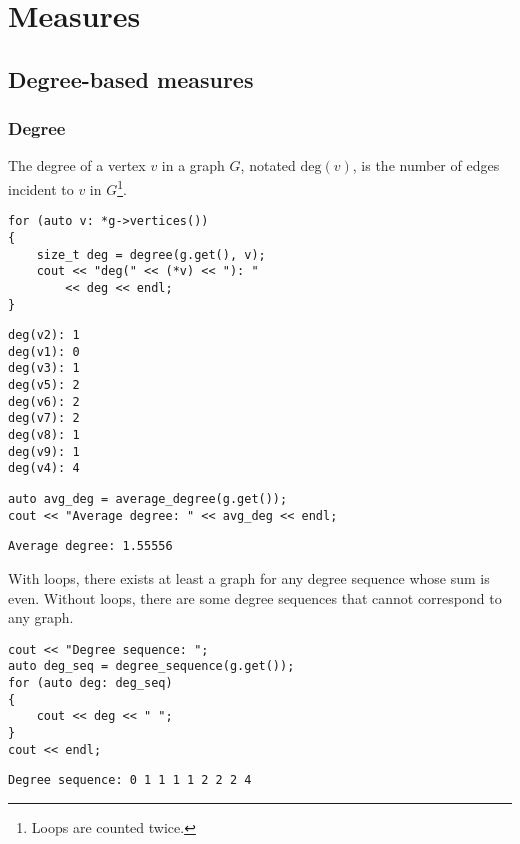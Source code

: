 \chapter{Measures}

\section{Degree-based measures}

\subsection{Degree}

\begin{definition}[Degree]
The degree of a vertex $v$ in a graph $G$, notated $\mathrm{deg}(v)$, is the number of edges incident to $v$ in $G$\footnote{Loops are counted twice.}. 
\end{definition}

\begin{lstlisting}[style=c++] 
for (auto v: *g->vertices())
{
    size_t deg = degree(g.get(), v);
    cout << "deg(" << (*v) << "): "
        << deg << endl;
}
\end{lstlisting}
\begin{lstlisting}[style=out]
deg(v2): 1
deg(v1): 0
deg(v3): 1
deg(v5): 2
deg(v6): 2
deg(v7): 2
deg(v8): 1
deg(v9): 1
deg(v4): 4
\end{lstlisting}


\begin{lstlisting}[style=c++] 
auto avg_deg = average_degree(g.get());
cout << "Average degree: " << avg_deg << endl;
\end{lstlisting}
\begin{lstlisting}[style=out]
Average degree: 1.55556
\end{lstlisting}

With loops, there exists at least a graph for any degree sequence whose sum is even. Without loops, there are some degree sequences that cannot correspond to any graph.

\begin{lstlisting}[style=c++] 
cout << "Degree sequence: ";
auto deg_seq = degree_sequence(g.get());
for (auto deg: deg_seq)
{
    cout << deg << " ";
}
cout << endl;
\end{lstlisting}
\begin{lstlisting}[style=out]
Degree sequence: 0 1 1 1 1 2 2 2 4 
\end{lstlisting}
    
